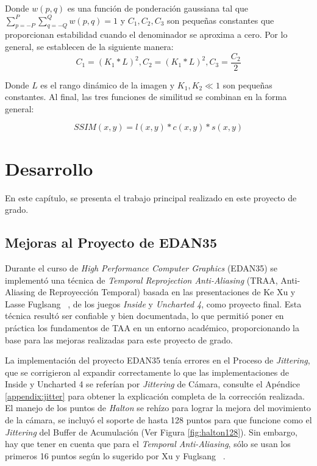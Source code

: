 \documentclass[pregrado]{tesis-usb} %
\begin{document}
Donde $w(p, q)$ es una función de ponderación gaussiana tal que $\sum\limits_{p = -P}^{P}\sum\limits_{q = -Q}^{Q} w(p, q) = 1$ y $C_1, C_2, C_3$ son pequeñas constantes que proporcionan estabilidad cuando el denominador se aproxima a cero. Por lo general, se establecen de la siguiente manera: 
\begin{equation*}
	C_1=(K_1*L)^2,C_2=(K_1*L)^2,C_3=\frac{C_2}{2}
\end{equation*}

Donde $L$ es el rango dinámico de la imagen y $K_1, K_2 \ll1$ son pequeñas constantes. Al final, las tres funciones de similitud se combinan en la forma general:

\begin{equation}\label{eq:ssim}
SSIM(x,y)=l(x,y)*c(x,y)*s(x,y)
\end{equation}



\chapter{Desarrollo}
En este capítulo, se presenta el trabajo principal realizado en este proyecto de grado.

\section{Mejoras al Proyecto de EDAN35}
Durante el curso de \textit{High Performance Computer Graphics} (EDAN35) se implementó una técnica de \textit{Temporal Reprojection Anti-Aliasing} (TRAA, Anti-Aliasing de Reproyección Temporal) basada en las presentaciones de Ke Xu y Lasse Fuglsang ~\cite{XU2016, Fuglsand2016}, de los juegos \textit{Inside} y \textit{Uncharted 4}, como proyecto final. Esta técnica resultó ser confiable y bien documentada, lo que permitió poner en práctica los fundamentos de TAA en un entorno académico, proporcionando la base para las mejoras realizadas para este proyecto de grado. 

La implementación del proyecto EDAN35 tenía errores en el Proceso de \textit{Jittering}, que se corrigieron al expandir correctamente lo que las implementaciones de Inside y Uncharted 4  se referían por \textit{Jittering} de Cámara, consulte el Apéndice \ref{appendix:jitter} para obtener la explicación completa de la corrección realizada. El manejo de los puntos de \textit{Halton} se rehízo para lograr la mejora del movimiento de la cámara, se incluyó el soporte de hasta 128 puntos para que funcione como el \textit{Jittering} del Buffer de Acumulación (Ver Figura \ref{fig:halton128}). Sin embargo, hay que tener en cuenta que para el \textit{Temporal Anti-Aliasing}, sólo se usan los primeros 16 puntos según lo sugerido por Xu y Fuglsang ~\cite{XU2016, Fuglsand2016}. 
\end{document}
